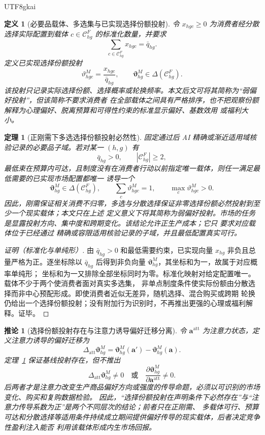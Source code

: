 \documentclass[12pt,a4paper,openany]{report}
\newtheorem{definition}{定义}[chapter]
\newtheorem{theorem}{定理}[chapter]
\newtheorem{corollary}{推论}[chapter]
\begin{document}
\begin{CJK*}{UTF8}{gkai}
\begin{definition}[必要品载体、多选集与已实现选择份额投射]
令 \(x_{hgc}\ge0\) 为消费者经分散选择实际配置到载体
\(c\in\mathcal C_{hg}^{F}\) 的标准化数量，并要求
\[
  \sum_{c\in\mathcal C_{hg}^{F}}x_{hgc}=\bar q_{hg}.
\]
定义已实现选择份额投射
\[
  \vartheta_{hgc}^{M}
  =\frac{x_{hgc}}{\bar q_{hg}},
  \qquad
  \boldsymbol\vartheta_{hg}^{M}
  \in\Delta\!\left(\mathcal C_{hg}^{F}\right).
\]
该投射只记录实际选择份额、选择概率或轮换频率。本文后文可将其简称为“弱偏好投射”，但该简称不要求消费者
在全部载体之间具有严格排序，也不把观察份额解释为心理偏好、脱离预算和可得性约束的标准显示偏好、基数效用
或福利大小。
\end{definition}

\begin{theorem}[正刚需下多选选择份额投射必然性]
\label{thm:essential-multichoice-projection}
固定通过后 AI 精确或渐近适用域核验记录的必要品子域。若对某一 \((h,g)\) 有
\[
  \bar q_{hg}>0,
  \qquad
  \left|\mathcal C_{hg}^{F}\right|\ge2,
\]
最低束在预算内可达，且制度没有在消费者行动以前指定唯一载体，则任一满足最低需要的已实现市场配置都唯一
诱导一个
\[
  \boldsymbol\vartheta_{hg}^{M}
  \in\Delta\!\left(\mathcal C_{hg}^{F}\right),
  \qquad
  \sum_{c}\vartheta_{hgc}^{M}=1,
  \qquad
  \max_c\vartheta_{hgc}^{M}>0.
\]
因此，刚需保证相关消费不归零，多选与分散选择保证非零选择份额必然投射到至少一个现实载体；本文只在上述
定义意义下将其简称为弱偏好投射。市场的任务是显露投射方向、集中度和跨期变化。该结论允许正生产成本；它只
要求对应载体位于已经通过
精确或容限适用核验记录的子域，并且最低配置真实可行。
\end{theorem}

\begin{proof}[证明（标准化与单纯形）]
由 \(\bar q_{hg}>0\) 和最低需要约束，已实现向量 \(x_{hg}\) 非负且总量严格为正。逐坐标除以
\(\bar q_{hg}\) 后得到非负向量 \(\boldsymbol\vartheta_{hg}^{M}\)，其坐标和为一，故属于对应概率单纯形；
坐标和为一又排除全部坐标同时为零。标准化映射对给定配置唯一。载体不少于两个使消费者面对真实多选集，
非单点制度条件使实际份额由分散选择而非中心预配形成。即使消费者近似无差异，随机选择、混合购买或跨期
轮换仍给出一个选择份额投射；没有附加行为识别时，不再推出更强的心理或福利解释。证毕。
\end{proof}

\begin{corollary}[选择份额投射存在与注意力诱导偏好迁移分离]
\label{cor:projection-versus-attention-shift}
令 \(\mathbf a^{\mathrm{att}}\) 为注意力状态，定义注意力诱导的偏好迁移为
\[
  \Delta_{\mathrm{att}}\boldsymbol\vartheta_{hg}^{M}
  =
  \boldsymbol\vartheta_{hg}^{M}(\mathbf a')
  -\boldsymbol\vartheta_{hg}^{M}(\mathbf a).
\]
定理~\ref{thm:essential-multichoice-projection} 保证基线投射存在，但不推出
\[
  \Delta_{\mathrm{att}}\boldsymbol\vartheta_{hg}^{M}\ne0
  \quad\text{或}\quad
  \frac{\partial\boldsymbol\vartheta_{hg}^{M}}
       {\partial\mathbf a^{\mathrm{att}}}\ne0.
\]
后两者才是注意力改变生产商品偏好方向或强度的传导命题，必须以可识别的市场变化、购买和复购数据检验。
因此，“选择份额投射在声明条件下必然存在”与“注意力传导系数为正”是两个不同层次的结论；前者只在正刚需、
多载体可行、预算可达和分散选择等适用条件持续成立期间提供偏好传导的现实载体，后者决定竞争性盈利注入能否
利用该载体形成内生市场回报。
\end{corollary}


\end{CJK*}
\end{document}
